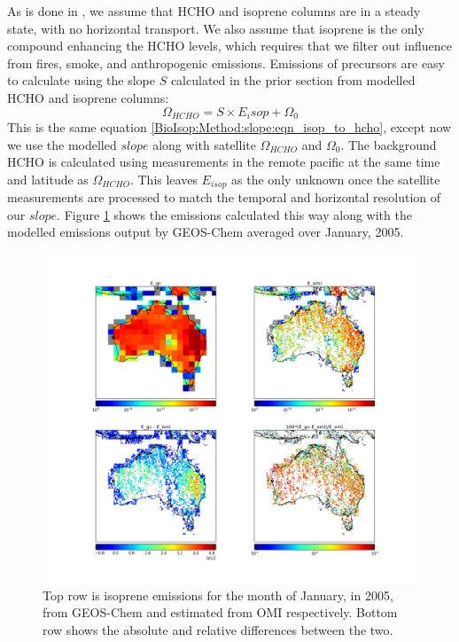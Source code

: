     As is done in \textcite{Palmer2003, Millet2006, Bauwens2016}, we assume that HCHO and isoprene columns are in a steady state, with no horizontal transport.
    We also assume that isoprene is the only compound enhancing the HCHO levels, which requires that we filter out influence from fires, smoke, and anthropogenic emissions.
    Emissions of precursors are easy to calculate using the slope $S$ calculated in the prior section from modelled HCHO and isoprene columns:
    \begin{equation}
    \Omega_{HCHO} = S \times E_isop + \Omega_0
    \end{equation}
    This is the same equation \ref{BioIsop:Method:slope:eqn_isop_to_hcho}, except now we use the modelled $slope$ along with satellite $\Omega_{HCHO}$ and $\Omega_0$.
    The background HCHO is calculated using measurements in the remote pacific at the same time and latitude as $\Omega_{HCHO}$.
    This leaves $E_{isop}$ as the only unknown once the satellite measurements are processed to match the temporal and horizontal resolution of our $slope$.
    Figure \ref{BioIsop:Calculation:fig_E_isop_200501} shows the emissions calculated this way along with the modelled emissions output by GEOS-Chem averaged over January, 2005.
    \begin{figure}
      \includegraphics[width=\textwidth]{Figures/Isoprene/E_Comparison.png}
      \caption{%
        Top row is isoprene emissions for the month of January, in 2005, from GEOS-Chem and estimated from OMI respectively.
        Bottom row shows the absolute and relative differences between the two.
      }
      \label{BioIsop:Calculation:fig_E_isop_200501}
    \end{figure}
    
